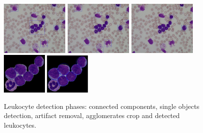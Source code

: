 {	\begin{figure}[h]
		\centering
		\includegraphics[width=0.3\textwidth]{images/2016_1_mva/DetectedIm001_1}
		\includegraphics[width=0.3\textwidth]{images/2016_1_mva/DetectedIm001_1small}
		\includegraphics[width=0.3\textwidth]{images/2016_1_mva/DetectedIm001_1solid}
		\includegraphics[width=0.2\textwidth]{images/2016_1_mva/agglomerateclosed}
		\includegraphics[width=0.2\textwidth]{images/2016_1_mva/agglomeratehough}
		\caption[Leukocytes detection phases.]{\label{fig:ex9}Leukocyte detection phases: connected components, single objects detection, artifact removal, agglomerates crop and detected leukocytes.}
	\end{figure}
	
}

